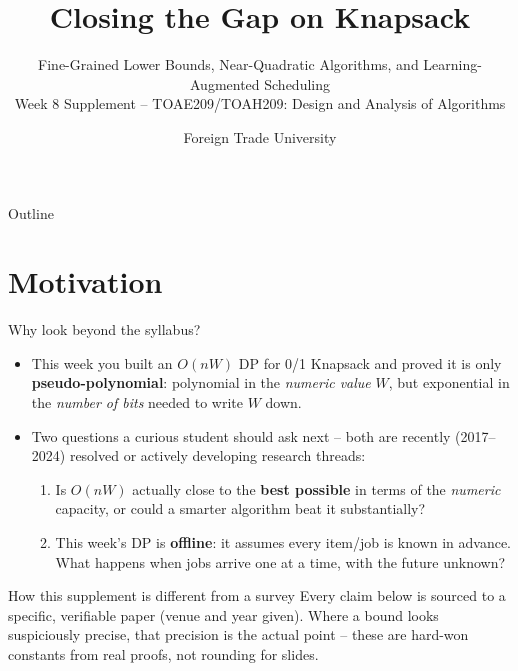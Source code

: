 \documentclass[11pt,aspectratio=169]{beamer}
\title{Closing the Gap on Knapsack}
\subtitle{Fine-Grained Lower Bounds, Near-Quadratic Algorithms, and Learning-Augmented
Scheduling\\
\small Week 8 Supplement -- TOAE209/TOAH209: Design and Analysis of Algorithms}
\author{Foreign Trade University}
\date{}
\begin{document}
\begin{frame}
  \titlepage
\end{frame}

\begin{frame}{Outline}
  \tableofcontents
\end{frame}

\section{Motivation}

\begin{frame}{Why look beyond the syllabus?}
  \begin{itemize}
    \item This week you built an $O(nW)$ DP for 0/1 Knapsack and proved it is only
    \textbf{pseudo-polynomial}: polynomial in the \emph{numeric value} $W$, but
    exponential in the \emph{number of bits} needed to write $W$ down.
    \item Two questions a curious student should ask next -- both are recently
    (2017--2024) resolved or actively developing research threads:
    \begin{enumerate}
      \item Is $O(nW)$ actually close to the \textbf{best possible} in terms of the
      \emph{numeric} capacity, or could a smarter algorithm beat it substantially?
      \item This week's DP is \textbf{offline}: it assumes every item/job is known in
      advance. What happens when jobs arrive one at a time, with the future unknown?
    \end{enumerate}
  \end{itemize}
  \begin{alertblock}{How this supplement is different from a survey}
    Every claim below is sourced to a specific, verifiable paper (venue and year given).
    Where a bound looks suspiciously precise, that precision is the actual point --
    these are hard-won constants from real proofs, not rounding for slides.
  \end{alertblock}
\end{frame}

\end{document}
